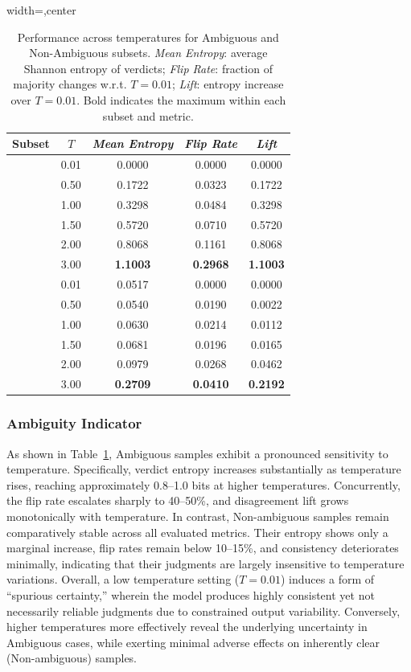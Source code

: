 \documentclass[11pt]{article}
\begin{document}
\begin{table}[t]
\centering
\small
\begin{adjustbox}{width=\columnwidth,center}
\begin{tabular}{l c c c c}
\toprule
Subset & \(T\) & \textit{Mean Entropy} & \textit{Flip Rate} & \textit{Lift} \\
\toprule
\rowcolor{gray!5}
\multirow{6}{*}{\textbf{Ambiguous}}
& 0.01 & 0.0000 & 0.0000 & 0.0000 \\
& 0.50 & 0.1722 & 0.0323 & 0.1722 \\
& 1.00 & 0.3298 & 0.0484 & 0.3298 \\
& 1.50 & 0.5720 & 0.0710 & 0.5720 \\
& 2.00 & 0.8068 & 0.1161 & 0.8068 \\
& 3.00 & \textbf{1.1003} & \textbf{0.2968} & \textbf{1.1003} \\
\midrule
\rowcolor{gray!8}
\multirow{6}{*}{\textbf{Non-Ambiguous}}
& 0.01 & 0.0517 & 0.0000 & 0.0000 \\
& 0.50 & 0.0540 & 0.0190 & 0.0022 \\
& 1.00 & 0.0630 & 0.0214 & 0.0112 \\
& 1.50 & 0.0681 & 0.0196 & 0.0165 \\
& 2.00 & 0.0979 & 0.0268 & 0.0462 \\
& 3.00 & \textbf{0.2709} & \textbf{0.0410} & \textbf{0.2192} \\
\bottomrule
\end{tabular}
\end{adjustbox}
\caption{Performance across temperatures for Ambiguous and Non-Ambiguous subsets. \textit{Mean Entropy}: average Shannon entropy of verdicts; \textit{Flip Rate}: fraction of majority changes w.r.t. \(T{=}0.01\); \textit{Lift}: entropy increase over \(T{=}0.01\). Bold indicates the maximum within each subset and metric.}
\label{tab:exp1f_single_max_per_group}
\end{table}

\subsubsection{Ambiguity Indicator}

As shown in Table~\ref{tab:exp1f_single_max_per_group}, Ambiguous samples exhibit a pronounced sensitivity to temperature. Specifically, verdict entropy increases substantially as temperature rises, reaching approximately 0.8--1.0 bits at higher temperatures. Concurrently, the flip rate escalates sharply to 40--50\%, and disagreement lift grows monotonically with temperature. In contrast, Non-ambiguous samples remain comparatively stable across all evaluated metrics. Their entropy shows only a marginal increase, flip rates remain below 10--15\%, and consistency deteriorates minimally, indicating that their judgments are largely insensitive to temperature variations. Overall, a low temperature setting (\(T = 0.01\)) induces a form of ``spurious certainty,'' wherein the model produces highly consistent yet not necessarily reliable judgments due to constrained output variability. Conversely, higher temperatures more effectively reveal the underlying uncertainty in Ambiguous cases, while exerting minimal adverse effects on inherently clear (Non-ambiguous) samples.
\end{document}
